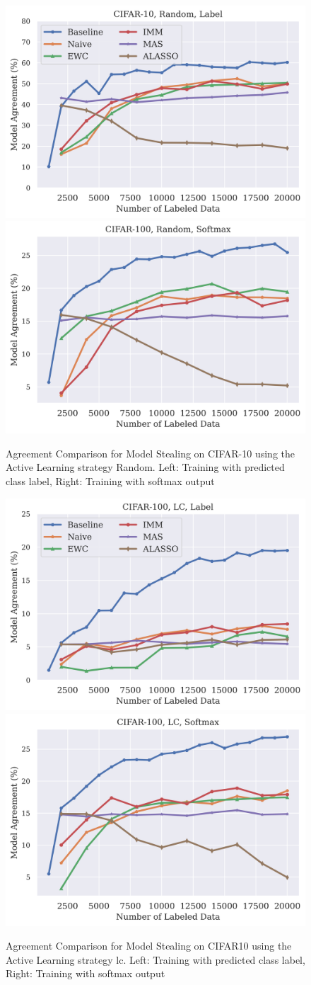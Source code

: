 \begin{figure}[!htb]
    \centering
    \includegraphics[width=0.48\linewidth]{images/results_CALMS/cifar_label_random.png} \hfill
    \includegraphics[width=0.48\linewidth]{images/results_CALMS/cifar100_softmax_random.png}
    \caption{Agreement Comparison for Model Stealing on CIFAR-10 using the Active Learning strategy Random. Left: Training with predicted class label,
    Right: Training with softmax output}
    \label{fig:CALMSCIFAR10Random}
\end{figure}

\begin{figure}[!htb]
    \centering
    \includegraphics[width=0.48\linewidth]{images/results_CALMS/cifar100_label_lc.png} \hfill
    \includegraphics[width=0.48\linewidth]{images/results_CALMS/cifar100_softmax_lc.png}
    \caption{Agreement Comparison for Model Stealing on CIFAR10 using the Active Learning strategy \gls{lc}. Left: Training with predicted class label,
    Right: Training with softmax output}
    \label{fig:CALMSCIFAR10LC}
\end{figure}

